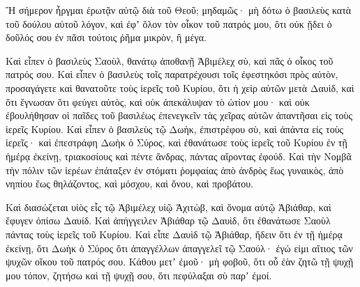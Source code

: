 {Ἢ σήμερον ἦργμαι ἐρωτᾷν αὐτῷ διὰ τοῦ Θεοῦ; μηδαμῶς· μὴ δότω ὁ βασιλεὺς κατὰ τοῦ δούλου αὐτοῦ λόγον, καὶ ἐφʼ ὅλον τὸν οἶκον τοῦ πατρός μου, ὅτι οὐκ ᾔδει ὁ δοῦλός σου ἐν πᾶσι τούτοις ῥῆμα μικρὸν, ἢ μέγα.
\par }{\PP {}Καὶ εἶπεν ὁ βασιλεὺς Σαοὺλ, θανάτῳ ἀποθανῇ Ἀβιμέλεχ σὺ, καὶ πᾶς ὁ οἶκος τοῦ πατρός σου.
Καὶ εἶπεν ὁ βασιλεὺς τοῖς παρατρέχουσι τοῖς ἐφεστηκόσι πρὸς αὐτὸν, προσαγάγετε καὶ θανατοῦτε τοὺς ἱερεῖς τοῦ Κυρίου, ὅτι ἡ χεὶρ αὐτῶν μετὰ Δαυὶδ, καὶ ὅτι ἔγνωσαν ὅτι φεύγει αὐτὸς, καὶ οὐκ ἀπεκάλυψαν τὸ ὠτίον μου· καὶ οὐκ ἐβουλήθησαν οἱ παῖδες τοῦ βασιλέως ἐπενεγκεῖν τὰς χεῖρας αὐτῶν ἁπαντῆσαι εἰς τοὺς ἱερεῖς Κυρίου.
Καὶ εἶπεν ὁ βασιλεὺς τῷ Δωὴκ, ἐπιστρέφου σὺ, καὶ ἀπάντα εἰς τοὺς ἱερεῖς· καὶ ἐπεστράφη Δωὴκ ὁ Σύρος, καὶ ἐθανάτωσε τοὺς ἱερεῖς τοῦ Κυρίου ἐν τῇ ἡμέρᾳ ἐκείνῃ, τριακοσίους καὶ πέντε ἄνδρας, πάντας αἴροντας ἐφούδ.
Καὶ τὴν Νομβᾶ τὴν πόλιν τῶν ἱερέων ἐπάταξεν ἐν στόματι ῥομφαίας ἀπὸ ἀνδρὸς ἕως γυναικὸς, ἀπὸ νηπίου ἕως θηλάζοντος, καὶ μόσχου, καὶ ὄνου, καὶ προβάτου.
\par }{\PP {}Καὶ διασώζεται υἱὸς εἷς τῷ Ἀβιμέλεχ υἱῷ Ἀχιτὼβ, καὶ ὄνομα αὐτῷ Ἀβιάθαρ, καὶ ἔφυγεν ὀπίσω Δαυίδ.
Καὶ ἀπήγγειλεν Ἀβιάθαρ τῷ Δαυὶδ, ὅτι ἐθανάτωσε Σαοὺλ πάντας τοὺς ἱερεῖς τοῦ Κυρίου.
Καὶ εἶπε Δαυὶδ τῷ Ἀβιάθαρ, ἤδειν ὅτι ἐν τῇ ἡμέρᾳ ἐκείνῃ, ὅτι Δωὴκ ὁ Σύρος ὅτι ἀπαγγέλλων ἀπαγγελεῖ τῷ Σαούλ· ἐγώ εἰμι αἴτιος τῶν ψυχῶν οἴκου τοῦ πατρός σου.
Κάθου μετʼ ἐμοῦ· μὴ φοβοῦ, ὅτι οὗ ἐὰν ζητῶ τῇ ψυχῇ μου τόπον, ζητήσω καὶ τῇ ψυχῇ σου, ὅτι πεφύλαξαι σὺ παρʼ ἐμοί.

}
